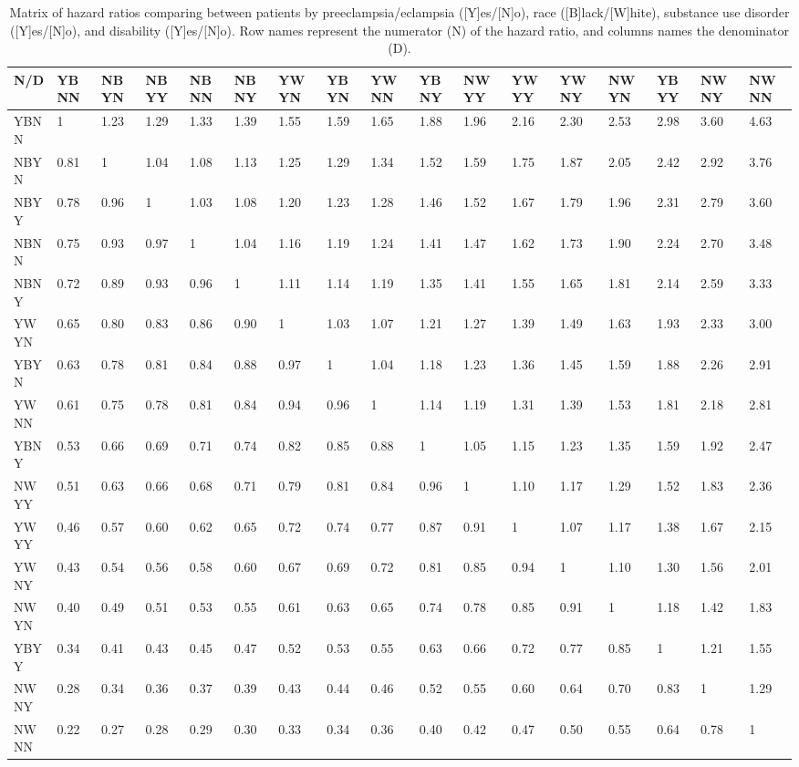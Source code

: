 \begin{table}[!htbp]
\centering
\begin{tabular}{lllllllllllllllll}
  \hline
N/D & YBNN & NBYN & NBYY & NBNN & NBNY & YWYN & YBYN & YWNN & YBNY & NWYY & YWYY & YWNY & NWYN & YBYY & NWNY & NWNN \\ 
  \hline
YBNN & 1 & 1.23 & 1.29 & 1.33 & 1.39 & 1.55 & 1.59 & 1.65 & 1.88 & 1.96 & 2.16 & 2.30 & 2.53 & 2.98 & 3.60 & 4.63 \\ 
  NBYN & 0.81 & 1 & 1.04 & 1.08 & 1.13 & 1.25 & 1.29 & 1.34 & 1.52 & 1.59 & 1.75 & 1.87 & 2.05 & 2.42 & 2.92 & 3.76 \\ 
  NBYY & 0.78 & 0.96 & 1 & 1.03 & 1.08 & 1.20 & 1.23 & 1.28 & 1.46 & 1.52 & 1.67 & 1.79 & 1.96 & 2.31 & 2.79 & 3.60 \\ 
  NBNN & 0.75 & 0.93 & 0.97 & 1 & 1.04 & 1.16 & 1.19 & 1.24 & 1.41 & 1.47 & 1.62 & 1.73 & 1.90 & 2.24 & 2.70 & 3.48 \\ 
  NBNY & 0.72 & 0.89 & 0.93 & 0.96 & 1 & 1.11 & 1.14 & 1.19 & 1.35 & 1.41 & 1.55 & 1.65 & 1.81 & 2.14 & 2.59 & 3.33 \\ 
  YWYN & 0.65 & 0.80 & 0.83 & 0.86 & 0.90 & 1 & 1.03 & 1.07 & 1.21 & 1.27 & 1.39 & 1.49 & 1.63 & 1.93 & 2.33 & 3.00 \\ 
  YBYN & 0.63 & 0.78 & 0.81 & 0.84 & 0.88 & 0.97 & 1 & 1.04 & 1.18 & 1.23 & 1.36 & 1.45 & 1.59 & 1.88 & 2.26 & 2.91 \\ 
  YWNN & 0.61 & 0.75 & 0.78 & 0.81 & 0.84 & 0.94 & 0.96 & 1 & 1.14 & 1.19 & 1.31 & 1.39 & 1.53 & 1.81 & 2.18 & 2.81 \\ 
  YBNY & 0.53 & 0.66 & 0.69 & 0.71 & 0.74 & 0.82 & 0.85 & 0.88 & 1 & 1.05 & 1.15 & 1.23 & 1.35 & 1.59 & 1.92 & 2.47 \\ 
  NWYY & 0.51 & 0.63 & 0.66 & 0.68 & 0.71 & 0.79 & 0.81 & 0.84 & 0.96 & 1 & 1.10 & 1.17 & 1.29 & 1.52 & 1.83 & 2.36 \\ 
  YWYY & 0.46 & 0.57 & 0.60 & 0.62 & 0.65 & 0.72 & 0.74 & 0.77 & 0.87 & 0.91 & 1 & 1.07 & 1.17 & 1.38 & 1.67 & 2.15 \\ 
  YWNY & 0.43 & 0.54 & 0.56 & 0.58 & 0.60 & 0.67 & 0.69 & 0.72 & 0.81 & 0.85 & 0.94 & 1 & 1.10 & 1.30 & 1.56 & 2.01 \\ 
  NWYN & 0.40 & 0.49 & 0.51 & 0.53 & 0.55 & 0.61 & 0.63 & 0.65 & 0.74 & 0.78 & 0.85 & 0.91 & 1 & 1.18 & 1.42 & 1.83 \\ 
  YBYY & 0.34 & 0.41 & 0.43 & 0.45 & 0.47 & 0.52 & 0.53 & 0.55 & 0.63 & 0.66 & 0.72 & 0.77 & 0.85 & 1 & 1.21 & 1.55 \\ 
  NWNY & 0.28 & 0.34 & 0.36 & 0.37 & 0.39 & 0.43 & 0.44 & 0.46 & 0.52 & 0.55 & 0.60 & 0.64 & 0.70 & 0.83 & 1 & 1.29 \\ 
  NWNN & 0.22 & 0.27 & 0.28 & 0.29 & 0.30 & 0.33 & 0.34 & 0.36 & 0.40 & 0.42 & 0.47 & 0.50 & 0.55 & 0.64 & 0.78 & 1 \\ 
   \hline
\end{tabular}
\caption{Matrix of hazard ratios comparing between patients by preeclampsia/eclampsia ([Y]es/[N]o), race ([B]lack/[W]hite), substance use disorder ([Y]es/[N]o), and disability ([Y]es/[N]o). Row names represent the numerator (N) of the hazard ratio, and columns names the denominator (D). } 
\end{table}
